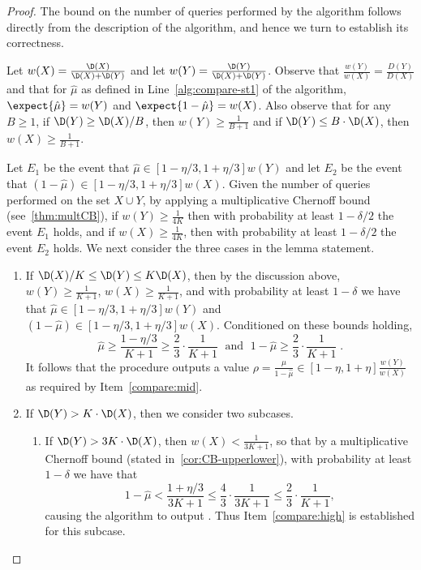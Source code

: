 \begin{proof}
The bound on the number of queries performed by the
algorithm follows directly from the description of the algorithm,
and hence we turn to establish its correctness.

Let $w(X) = \frac{\D(X)}{\D(X) +\D(Y)}$ and let
$w(Y) = \frac{\D(Y)}{\D(X) +\D(Y)}$.
Observe that $\frac{w(Y)}{w(X)} = \frac{D(Y)}{D(X)}$
and that for $\hat{\mu}$ as defined in Line~\ref{alg:compare-st1} of the
algorithm, $\expect{\hat{\mu}}=w(Y)$ and $\expect{1-\hat{\mu}} = w(X)$.
Also observe that for any $B \geq 1$,
if $\D(Y) \geq \D(X)/B$,
then $w(Y) \geq \frac{1}{B+1}$ and
if $\D(Y) \leq B\cdot\D(X)$, then
$w(X) \geq \frac{1}{B+1}$.

Let $E_1$ be the event that $\hat{\mu} \in [1-\eta/3,1+\eta/3]w(Y)$
and let $E_2$ be the event that
$(1-\hat{\mu}) \in [1-\eta/3,1+\eta/3]w(X)$.
Given the number of \COND queries
performed on the set $X\cup Y$,
by applying a multiplicative Chernoff bound (see~\cref{thm:multCB}), if
$w(Y) \geq \frac{1}{4K}$ then with probability
at least $1-\delta/2$ the event $E_1$ holds, and if
$w(X) \geq \frac{1}{4K}$, then with probability
at least $1-\delta/2$ the event $E_2$ holds.
We next consider the three cases in the lemma statement.
\begin{enumerate}
\item If $\D(X)/K \leq \D(Y) \leq K \D(X)$, then
by the discussion above, $w(Y) \geq \frac{1}{K+1}$,
$w(X) \geq \frac{1}{K+1}$, and
with probability at least $1-\delta$ we have
that $\hat{\mu} \in [1-\eta/3,1+\eta/3]w(Y)$ and
$(1-\hat{\mu}) \in [1-\eta/3,1+\eta/3]w(X)$.
Conditioned on these bounds holding,
$$\hat{\mu} \geq \frac{1-\eta/3}{K+1} \geq \frac{2}{3}\cdot \frac{1}{K+1}\;
\mbox{ and } \;1-\hat{\mu} \geq \frac{2}{3}\cdot \frac{1}{K+1}\;.$$
It
follows that the procedure outputs a value $\rho = \frac{\hat{\mu}}{1-\hat{\mu}}
\in [1-\eta,1+\eta]\frac{w(Y)}{w(X)}$
as required by Item~\ref{compare:mid}.
\item If $\D(Y) > K\cdot\D(X)$, then we consider two subcases.
  \begin{enumerate}
  \item If $\D(Y) > 3K\cdot\D(X)$, then $w(X) < \frac{1}{3K+1}$,
  so that by a multiplicative Chernoff bound
  (stated in~\cref{cor:CB-upperlower}), with probability
  at least $1-\delta$ we have that
  $$1-\hat{\mu} < \frac{1+\eta/3}{3K+1} \leq \frac{4}{3}\cdot\frac{1}{3K+1}
     \leq \frac{2}{3}\cdot\frac{1}{K+1}, $$
     causing the algorithm to output \high. Thus Item~\ref{compare:high}
     is established for this subcase.

\end{enumerate}
\end{enumerate}
\end{proof}
